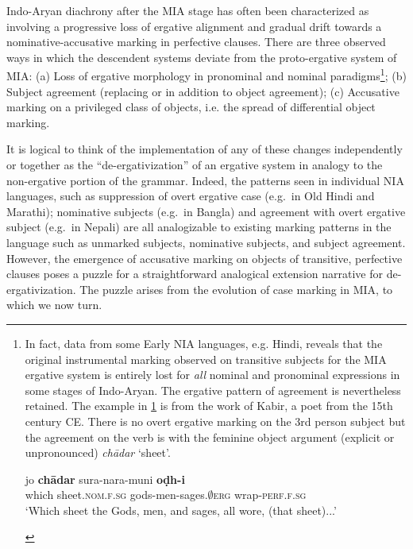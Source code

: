 \documentclass[output=paper,
modfonts
]{LSP/langsci}
\begin{document}
 Indo-Aryan  diachrony after the MIA stage  has often been  characterized as involving a progressive loss of  ergative alignment and gradual drift towards a nominative-accusative marking in perfective clauses.  There are three observed ways in which the  descendent systems deviate from the proto-ergative system of MIA: (a) Loss of ergative morphology in pronominal and nominal paradigms\footnote{In fact, data from some Early NIA languages, e.g. Hindi, reveals that the original instrumental
marking observed on transitive subjects for the MIA
ergative system is entirely lost for \textit{all} nominal and pronominal expressions in some stages of Indo-Aryan. The ergative pattern of agreement is nevertheless retained. The example in \cref{ex:jo} is from the work of Kabir, a poet from the 15th century CE. There is no overt ergative marking on the 3rd person subject but the agreement on the verb is  with the
feminine object argument (explicit or unpronounced) \textit{chādar}
`sheet'.

\begin{exe}
\ex\label{ex:jo}\gll jo \textbf{chādar} sura-nara-muni \textbf{oḍh-i} \\ 
which sheet.\textsc{nom.f.sg} gods-men-sages.\textsc{$\emptyset$erg}
wrap-\textsc{perf.f.sg}\\
\glt `Which sheet the  Gods, men, and sages, all wore, (that sheet)...'
\end{exe} 

 }; (b) Subject agreement (replacing or in addition to object agreement); (c) Accusative marking on a privileged class of objects, i.e. the spread of differential object marking.
 

It is logical to think of  the implementation of any of these changes independently or together as the ``de-ergativization'' of  an ergative system in analogy to the non-ergative portion of the grammar.  Indeed, the patterns seen in individual  NIA languages, such as suppression of overt ergative case (e.g.\ in Old Hindi and Marathi); nominative subjects (e.g.\ in Bangla) and  agreement with overt ergative subject (e.g.\ in Nepali) are all analogizable to existing marking patterns in the language such as unmarked subjects,  nominative subjects, and subject agreement. However, the emergence of accusative marking on objects of transitive, perfective clauses poses a puzzle for a straightforward analogical extension narrative for de-ergativization. The puzzle  arises from the evolution of case marking in MIA, to which we now turn. 
\end{document}
